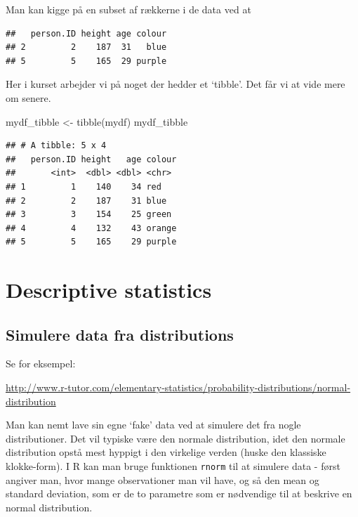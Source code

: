 \documentclass[
]{book}
\newenvironment{Shaded}{\begin{snugshade}}{\end{snugshade}}
\newcommand{\CommentTok}[1]{\textcolor[rgb]{0.56,0.35,0.01}{\textit{#1}}}
\newcommand{\DecValTok}[1]{\textcolor[rgb]{0.00,0.00,0.81}{#1}}
\newcommand{\FunctionTok}[1]{\textcolor[rgb]{0.00,0.00,0.00}{#1}}
\newcommand{\NormalTok}[1]{#1}
\newcommand{\OtherTok}[1]{\textcolor[rgb]{0.56,0.35,0.01}{#1}}
\newcommand{\SpecialCharTok}[1]{\textcolor[rgb]{0.00,0.00,0.00}{#1}}
\begin{document}
Man kan kigge på en subset af rækkerne i de data ved at

\begin{Shaded}
\end{Shaded}

\begin{verbatim}
##   person.ID height age colour
## 2         2    187  31   blue
## 5         5    165  29 purple
\end{verbatim}

Her i kurset arbejder vi på noget der hedder et `tibble'. Det får vi at vide mere om senere.

\begin{Shaded}
\begin{Highlighting}[]
\NormalTok{mydf\_tibble }\OtherTok{\textless{}{-}} \FunctionTok{tibble}\NormalTok{(mydf)}
\NormalTok{mydf\_tibble}
\end{Highlighting}
\end{Shaded}

\begin{verbatim}
## # A tibble: 5 x 4
##   person.ID height   age colour
##       <int>  <dbl> <dbl> <chr> 
## 1         1    140    34 red   
## 2         2    187    31 blue  
## 3         3    154    25 green 
## 4         4    132    43 orange
## 5         5    165    29 purple
\end{verbatim}

\hypertarget{descriptive-statistics}{%
\section{Descriptive statistics}\label{descriptive-statistics}}

\hypertarget{simulere-data-fra-distributions}{%
\subsection{Simulere data fra distributions}\label{simulere-data-fra-distributions}}

Se for eksempel:

\url{http://www.r-tutor.com/elementary-statistics/probability-distributions/normal-distribution}

Man kan nemt lave sin egne `fake' data ved at simulere det fra nogle distributioner. Det vil typiske være den normale distribution, idet den normale distribution opstå mest hyppigt i den virkelige verden (huske den klassiske klokke-form). I R kan man bruge funktionen \texttt{rnorm} til at simulere data - først angiver man, hvor mange observationer man vil have, og så den mean og standard deviation, som er de to parametre som er nødvendige til at beskrive en normal distribution.
\end{document}
